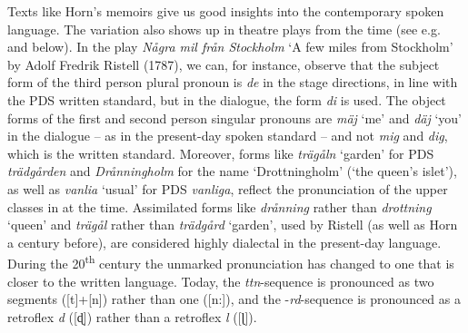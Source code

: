 \documentclass[output=paper]{langscibook}
\begin{document}
Texts like Horn’s memoirs give us good insights into the contemporary spoken language. The variation also shows up in theatre plays from the time (see e.g. \citealt{Widmark1970} and below). In the play \textit{Några mil från Stockholm} ‘A few miles from Stockholm’ by Adolf Fredrik Ristell (1787), we can, for instance, observe that the subject form of the third person plural pronoun is \textit{de} in the stage directions, in line with the PDS written standard, but in the dialogue, the form \textit{di} is used. The object forms of the first and second person singular pronouns are \textit{mäj} ‘me’ and \textit{däj} ‘you’ in the dialogue – as in the present-day spoken standard – and not \textit{mig} and \textit{dig}, which is the written standard. Moreover, forms like \textit{trägåln} ‘garden’ for PDS \textit{trädgården} and \textit{Drånningholm} for the name ‘Drottningholm’ (‘the queen’s islet’), as well as \textit{vanlia} ‘usual’ for PDS \textit{vanliga}, reflect the pronunciation of the upper classes in  at the time. Assimilated forms like \textit{drånning} rather than \textit{drottning} ‘queen’ and \textit{trägål} rather than \textit{trädgård} ‘garden’, used by Ristell (as well as Horn a century before), are considered highly dialectal in the present-day language. During the 20\textsuperscript{th} century the unmarked pronunciation has changed to one that is closer to the written language. Today, the \textit{ttn}{}-sequence is pronounced as two segments ([t]+[n]) rather than one ([n:]), and the -\textit{rd}{}-sequence is pronounced as a retroflex \textit{d} ([ɖ]) rather than a retroflex \textit{l} ([ɭ]).
\end{document}
